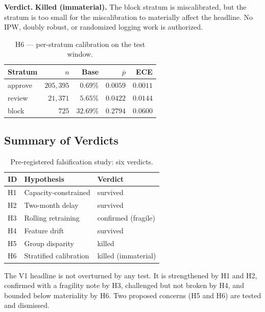 \documentclass[conference]{IEEEtran}
\begin{document}
\textbf{Verdict.} \textbf{Killed (immaterial).} The block stratum is
miscalibrated, but the stratum is too small for the miscalibration to
materially affect the headline. No IPW, doubly robust, or randomized
logging work is authorized.

\begin{table}[!t]
\caption{H6 — per-stratum calibration on the test window.}
\label{tab:h6}
\centering
\small
\begin{tabular}{lrrrr}
\toprule
Stratum & $n$ & Base & $\overline{p}$ & ECE \\
\midrule
approve & $205{,}395$ & $0.69\%$ & $0.0059$ & $0.0011$ \\
review  & $21{,}371$  & $5.65\%$ & $0.0422$ & $0.0144$ \\
block   & $725$       & $32.69\%$& $0.2794$ & $\mathbf{0.0600}$ \\
\bottomrule
\end{tabular}
\end{table}

\subsection{Summary of Verdicts}

\begin{table}[!t]
\caption{Pre-registered falsification study: six verdicts.}
\label{tab:verdicts}
\centering
\small
\begin{tabular}{lll}
\toprule
ID & Hypothesis & Verdict \\
\midrule
H1 & Capacity-constrained        & survived \\
H2 & Two-month delay             & survived \\
H3 & Rolling retraining          & confirmed (fragile) \\
H4 & Feature drift               & survived \\
H5 & Group disparity             & killed \\
H6 & Stratified calibration      & killed (immaterial) \\
\bottomrule
\end{tabular}
\end{table}

The V1 headline is not overturned by any test. It is strengthened by H1 and
H2, confirmed with a fragility note by H3, challenged but not broken by H4,
and bounded below materiality by H6. Two proposed concerns (H5 and H6) are
tested and dismissed.

\end{document}
